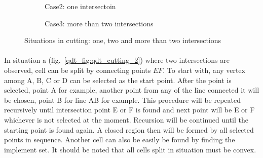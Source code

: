\begin{figure}[!ht]
\begin{subfigure}[b]{0.3\linewidth}
        \caption{Case2: one intersectoin}
    \end{subfigure}
    \begin{subfigure}[b]{0.3\linewidth}
        \caption{Case3: more than two intersections}
        \label{qdt_fig:qdt_cutting_3}
    \end{subfigure}
    \caption[Situations in cutting]{Situations in cutting: one, two and more than two intersections}
    \label{qdt_fig:qdt_cutting}
\end{figure}

\paragraph{}
In situation a (fig.~\ref{qdt_fig:qdt_cutting_2}) where two intersections are observed, cell can be split by connecting points $EF$.
To start with, any vertex among A, B, C or D can be selected as the start point.
After the point is selected, point A for example, another point from any of the line connected it will be chosen, point B for line AB for example.
This procedure will be repeated recursively until intersection point E or F is found and next point will be E or F whichever is not selected at the moment.
Recursion will be continued until the starting point is found again.
A closed region then will be formed by all selected points in sequence.
Another cell can also be easily be found by finding the implement set.
It should be noted that all cells split in situation must be convex.

